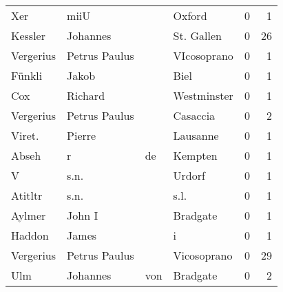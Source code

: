 \begin{tabular}{llllrr}
                      Xer &                               miiU &             &                                      Oxford &          0 &         1 \\
                  Kessler &                           Johannes &             &                                  St. Gallen &          0 &        26 \\
                Vergerius &                      Petrus Paulus &             &                                 VIcosoprano &          0 &         1 \\
                   Fünkli &                              Jakob &             &                                        Biel &          0 &         1 \\
                      Cox &                            Richard &             &                                 Westminster &          0 &         1 \\
                Vergerius &                      Petrus Paulus &             &                                    Casaccia &          0 &         2 \\
                   Viret. &                             Pierre &             &                                    Lausanne &          0 &         1 \\
                    Abseh &                                  r &          de &                                     Kempten &          0 &         1 \\
                        V &                               s.n. &             &                                      Urdorf &          0 &         1 \\
                  Atitltr &                               s.n. &             &                                        s.l. &          0 &         1 \\
                   Aylmer &                             John I &             &                                    Bradgate &          0 &         1 \\
                   Haddon &                              James &             &                                           i &          0 &         1 \\
                Vergerius &                      Petrus Paulus &             &                                 Vicosoprano &          0 &        29 \\
                      Ulm &                           Johannes &         von &                                    Bradgate &          0 &         2 \\

\end{tabular}

